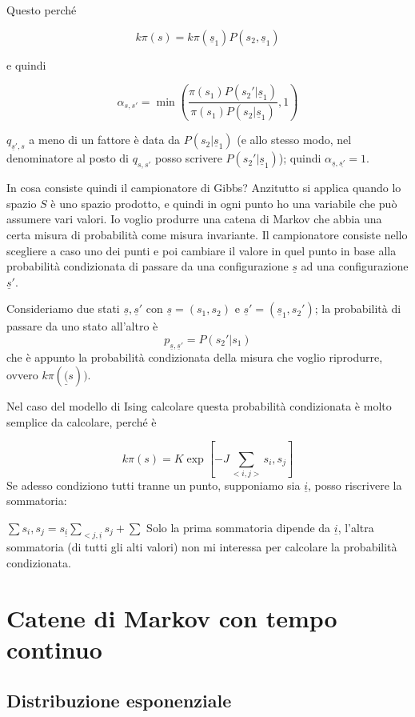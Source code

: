 \documentclass[a4paper,12pt]{book}
\begin{document}
Questo perché

$$ k\pi(s) = k\pi(\underline{s}_1)P(s_2, \underline{s}_1) $$ 

e quindi 

$$ \alpha_{s,s'} = \min \left(\frac{\pi(s_1)P(s_2' | \underline{s}_1)}{\pi(s_1)P(s_2 | \underline{s}_1)}, 1\right) $$

$ q_{\underline{s}', s} $ a meno di un fattore è data da $ P(s_2 | \underline{s}_1) $ (e allo stesso modo, nel denominatore al posto di $ q_{s,s'} $ posso scrivere $ P(s_2' | \underline{s}_1) $); quindi $\alpha_{\underline{s},\underline{s'}} = 1$. 

In cosa consiste quindi il campionatore di Gibbs? Anzitutto si applica quando lo spazio $ S $ è uno spazio prodotto, e quindi in ogni punto ho una variabile che può assumere vari valori. Io voglio produrre una catena di Markov che abbia una certa misura di probabilità come misura invariante. Il campionatore consiste nello scegliere a caso uno dei punti e poi cambiare il valore in quel punto in base alla probabilità condizionata di passare da una configurazione $ \underline{s} $ ad una configurazione $ \underline{s}' $. 

Consideriamo due stati $ \underline{s}, \underline{s}' $ con $ \underline{s} = (s_1, s_2) $ e $ \underline{s}' = (\underline{s}_1, s_2')$; la probabilità di passare da uno stato all'altro è 
$$ p_{\underline{s},\underline{s}'} = P(s_2' | s_1) $$
che è appunto la probabilità condizionata della misura che voglio riprodurre, ovvero $ k\pi(\underline(s)) $. 

Nel caso del modello di Ising calcolare questa probabilità condizionata è molto semplice da calcolare, perché è 

$$ k\pi(s) = K \exp [-J \sum_{<i, j>} s_i, s_j] $$
Se adesso condiziono tutti tranne un punto, supponiamo sia $\underline{i}$, posso riscrivere la sommatoria:

$\sum s_i, s_j = s_{\underline{i}} \sum_{<j, \underline{i}} s_j + \sum$
Solo la prima sommatoria dipende da $ \underline{i} $, l'altra sommatoria (di tutti gli alti valori) non mi interessa per calcolare la probabilità condizionata.

\chapter{Catene di Markov con tempo continuo}

\section{Distribuzione esponenziale}
\end{document}
